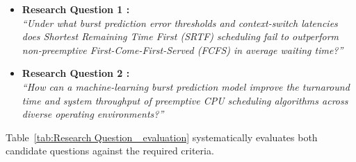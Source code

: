 \documentclass[11pt]{article}
\begin{document}
\begin{itemize}[leftmargin=1.5em]
    \item \textbf{Research Question 1 :} \\
    \textit{``Under what burst prediction error thresholds and context-switch latencies does Shortest Remaining Time First (SRTF) scheduling fail to outperform non-preemptive First-Come-First-Served (FCFS) in average waiting time?''}
    
    \vspace{0.4em}
    \item \textbf{Research Question 2 :} \\
    \textit{``How can a machine-learning burst prediction model improve the turnaround time and system throughput of preemptive CPU scheduling algorithms across diverse operating environments?''}
\end{itemize}

Table~\ref{tab:Research Question _evaluation} systematically evaluates both candidate questions against the required criteria.
\end{document}
